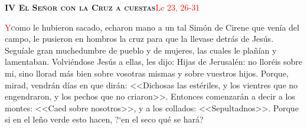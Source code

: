 \noindent\textbf{\textsc{IV El Señor con la Cruz a cuestas}}\hfill\textcolor{red}{Lc 23, 26-31}

\vspace{0.25em}

\lettrine[lines=2]{\textcolor{red}{Y}} como le hubieron sacado, echaron mano a un tal Simón de Cirene que venía del campo, le pusieron en hombros la cruz para que la llevase detrás de Jesús.
Seguíale gran muchedumbre de pueblo y de mujeres, las cuales le plañían y lamentaban. Volviéndose Jesús a ellas, les dijo: Hijas de Jerusalén: no lloréis sobre mi, sino llorad más bien
sobre vosotras mismas y sobre vuestros hijos. Porque, mirad, vendrán días en que dirán: <<Dichosas las estériles, y los vientres que no engendraron, y los pechos que no criaron>>. Entonces
comenzarán a decir a los montes: <<Caed sobre nosotros>>, y a los collados: <<Sepultadnos>>. Porque si en el leño verde esto hacen, {?`}en el seco qué se hará?